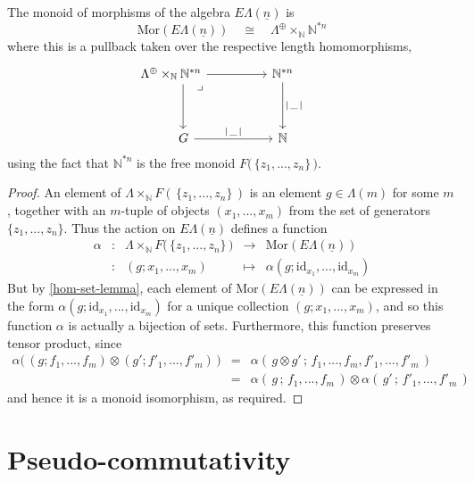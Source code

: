 \documentclass{amsbook} %
\newcommand{\lop}{\Lambda^{\oplus}}
\newcommand{\ELn}{E\Lambda(\underline{n})}
\numberwithin{section}{chapter}
\begin{document}
\begin{lem} \label{Gnmor} The monoid of morphisms of the algebra $\ELn$ is
\[ \mathrm{Mor}(\ELn) \quad \cong \quad \lop \times_{\mathbb{N}} \mathbb{N}^{\ast n} \]
where this is a pullback taken over the respective length homomorphisms,
\[ \begin{tikzcd}
\lop \times_{\mathbb{N}} \mathbb{N}^{\ast n} \ar[dd, shift left=4] \ar[rr] \ar[ddrr, phantom, "\lrcorner", very near start, shift left] & & \mathbb{N}^{\ast n} \ar[dd, "| \, \_ \, |"] & \\
& & & \\
\quad \quad G \ar[rr, "| \, \_ \, |"] & & \mathbb{N} &
\end{tikzcd} \]
using the fact that $\mathbb{N}^{\ast n}$ is the free monoid $F\big( \, \{z_1, ..., z_n\} \, \big)$.
\end{lem}
\begin{proof}
An element of $\Lambda \times_{\mathbb{N}} F( \, \{z_1, ..., z_n\} \, )$ is an element $g \in \Lambda(m)$ for some $m$, together with an $m$-tuple of objects $(x_1, ..., x_m)$ from the set of generators $\{z_1, ..., z_n\}$. Thus the action on $\ELn$ defines a function 
\[ \begin{array}{rlrll}
			\alpha & : & \Lambda \times_{\mathbb{N}} F\big( \, \{z_1, ..., z_n\} \, \big) & \to & \mathrm{Mor}(\ELn) \\
			& : & (g;x_1, ..., x_m) & \mapsto & \alpha(g; \mathrm{id}_{x_1}, ..., \mathrm{id}_{x_m})
		\end{array}
\]
But by \cref{hom-set-lemma}, each element of $\mathrm{Mor}(\ELn)$ can be expressed in the form $\alpha(g; \mathrm{id}_{x_1}, ..., \mathrm{id}_{x_m})$ for a unique collection $(g;x_1, ..., x_m)$, and so this function $\alpha$ is actually a bijection of sets. Furthermore, this function preserves tensor product, since
\[ \begin{array}{rll}
			\alpha\big( \, (g;f_1, ..., f_m) \otimes (g';f'_1, ..., f'_m) \, \big) & = & \alpha( \, g \otimes g' \, ; \, f_1, ..., f_m, f'_1, ..., f'_m \, ) \\
			& = & \alpha( \, g \, ; \, f_1, ..., f_m \, ) \otimes \alpha( \, g' \, ; \, f'_1, ..., f'_m \, )
		\end{array}
\]
and hence it is a monoid isomorphism, as required.
\end{proof}

\section{Pseudo-commutativity}
\end{document}

